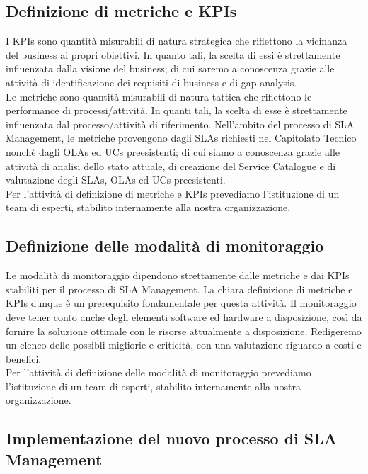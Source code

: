 \subsection{Definizione di metriche e KPIs}

I KPIs sono quantità misurabili di natura strategica che riflettono la vicinanza del business ai propri obiettivi. In quanto tali, la scelta di essi è strettamente influenzata dalla visione del business; di cui saremo a conoscenza grazie alle attività di identificazione dei requisiti di business e di gap analysis.
\\
Le metriche sono quantità misurabili di natura tattica che riflettono le performance di processi/attività. In quanti tali, la scelta di esse è strettamente influenzata dal processo/attività di riferimento. Nell'ambito del processo di SLA Management, le metriche provengono dagli SLAs richiesti nel Capitolato Tecnico nonchè dagli OLAs ed UCs preesistenti; di cui siamo a conoscenza grazie alle attività di analisi dello stato attuale, di creazione del Service Catalogue e di valutazione degli SLAs, OLAs ed UCs preesistenti.
\\
Per l'attività di definizione di metriche e KPIs prevediamo l'istituzione di un team di esperti, stabilito internamente alla nostra organizzazione.

\subsection{Definizione delle modalità di monitoraggio}

Le modalità di monitoraggio dipendono strettamente dalle metriche e dai KPIs stabiliti per il processo di SLA Management. La chiara definizione di metriche e KPIs dunque è un prerequisito fondamentale per questa attività. Il monitoraggio deve tener conto anche degli elementi software ed hardware a disposizione, così da fornire la soluzione ottimale con le risorse attualmente a disposizione. Redigeremo un elenco delle possibli migliorie e criticità, con una valutazione riguardo a costi e benefici.
\\
Per l'attività di definizione delle modalità di monitoraggio prevediamo l'istituzione di un team di esperti, stabilito internamente alla nostra organizzazione.

\subsection{Implementazione del nuovo processo di SLA Management}


